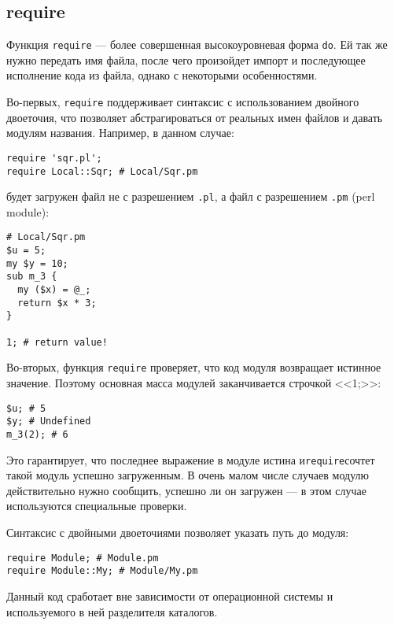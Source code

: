 \subsection{require} %
Функция \verb|require| --- более совершенная высокоуровневая форма \verb|do|. Ей так же нужно передать имя файла, после чего произойдет импорт и последующее исполнение кода из файла, однако с некоторыми особенностями.

Во-первых, \verb|require| поддерживает синтаксис с использованием двойного двоеточия, что позволяет абстрагироваться от реальных имен файлов и давать модулям названия. Например, в данном случае:
\begin{verbatim}
require 'sqr.pl';
require Local::Sqr; # Local/Sqr.pm
\end{verbatim}
будет загружен файл не с разрешением \verb|.pl|, а файл с разрешением \verb|.pm| (perl module):
\begin{verbatim}
# Local/Sqr.pm
$u = 5;
my $y = 10;
sub m_3 {
  my ($x) = @_;
  return $x * 3;
}

1; # return value!
\end{verbatim}
Во-вторых, функция \verb|require| проверяет, что код модуля возвращает истинное значение. Поэтому основная масса модулей заканчивается строчкой <<1;>>:
\begin{verbatim}
$u; # 5
$y; # Undefined
m_3(2); # 6
\end{verbatim}
Это гарантирует, что последнее выражение в модуле истина и\verb|require|сочтет такой модуль успешно загруженным. В очень малом числе случаев модулю действительно нужно сообщить, успешно ли он загружен --- в этом случае используются специальные проверки.

Синтаксис с двойными двоеточиями позволяет указать путь до модуля:
\begin{verbatim}
require Module; # Module.pm
require Module::My; # Module/My.pm
\end{verbatim}
Данный код сработает вне зависимости от операционной системы и используемого в ней разделителя каталогов.

